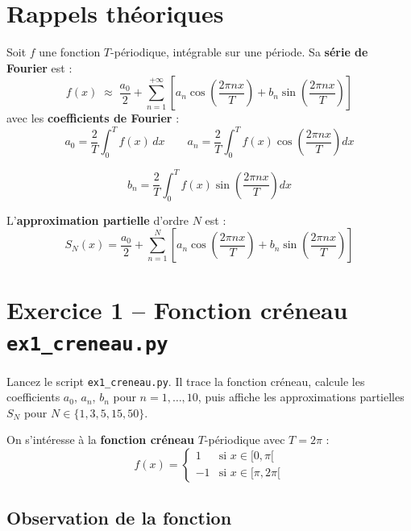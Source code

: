 \documentclass[12pt,a4paper]{article}
\begin{document}
\section{Rappels théoriques}

\begin{rappelbox}
Soit $f$ une fonction $T$-périodique, intégrable sur une période. Sa \textbf{série de Fourier} est :
\[
    f(x) \;\approx\; \frac{a_0}{2} + \sum_{n=1}^{+\infty} \left[ a_n \cos\!\left(\frac{2\pi n x}{T}\right) + b_n \sin\!\left(\frac{2\pi n x}{T}\right) \right]
\]
avec les \textbf{coefficients de Fourier} :
\[
    a_0 = \frac{2}{T} \int_{0}^{T} f(x)\, dx
    \qquad
    a_n = \frac{2}{T} \int_{0}^{T} f(x)\cos\!\left(\frac{2\pi n x}{T}\right) dx \]
    
    \[b_n = \frac{2}{T} \int_{0}^{T} f(x)\sin\!\left(\frac{2\pi n x}{T}\right) dx \]

\end{rappelbox}

\medskip
L'\textbf{approximation partielle} d'ordre $N$ est :
\[
    S_N(x) = \frac{a_0}{2} + \sum_{n=1}^{N} \left[ a_n \cos\!\left(\frac{2\pi n x}{T}\right) + b_n \sin\!\left(\frac{2\pi n x}{T}\right) \right]
\]

\section{Exercice 1 -- Fonction créneau \hfill\normalsize\texttt{ex1\_creneau.py}}

\begin{fichierbox}
Lancez le script \texttt{ex1\_creneau.py}. Il trace la fonction créneau, calcule les coefficients $a_0$, $a_n$, $b_n$ pour $n=1,\ldots,10$, puis affiche les approximations partielles $S_N$ pour $N \in \{1, 3, 5, 15, 50\}$.
\end{fichierbox}

On s'intéresse à la \textbf{fonction créneau} $T$-périodique avec $T = 2\pi$ :
\[
    f(x) = \begin{cases} 1 & \text{si } x \in [0, \pi[ \\ -1 & \text{si } x \in [\pi, 2\pi[ \end{cases}
\]

\subsection{Observation de la fonction}
\end{document}
